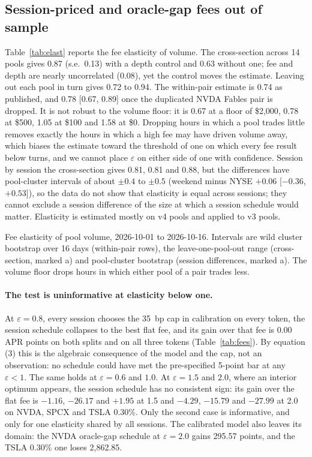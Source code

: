 \documentclass[11pt]{article}
\newcommand{\USD}{\$}
\newcommand{\tabfit}[1]{\begin{adjustbox}{max width=\linewidth,center}\small\end{adjustbox}}
\begin{document}
\subsection{Session-priced and oracle-gap fees out of sample}\label{sec:res:fees}

Table~\ref{tab:elast} reports the fee elasticity of volume. The cross-section across 14 pools gives 0.87 (s.e.\ 0.13) with a depth control and 0.63 without one; fee and depth are nearly uncorrelated (0.08), yet the control moves the estimate. Leaving out each pool in turn gives 0.72 to 0.94. The within-pair estimate is 0.74 as published, and 0.78 [0.67, 0.89] once the duplicated NVDA Fables pair is dropped. It is not robust to the volume floor: it is 0.67 at a floor of \USD2,000, 0.78 at \USD500, 1.05 at \USD100 and 1.58 at \USD0. Dropping hours in which a pool trades little removes exactly the hours in which a high fee may have driven volume away, which biases the estimate toward the threshold of one on which every fee result below turns, and we cannot place $\varepsilon$ on either side of one with confidence. Session by session the cross-section gives 0.81, 0.81 and 0.88, but the differences have pool-cluster intervals of about $\pm0.4$ to $\pm0.5$ (weekend minus NYSE $+0.06$ [$-0.36$, $+0.53$]), so the data do not show that elasticity is equal across sessions; they cannot exclude a session difference of the size at which a session schedule would matter. Elasticity is estimated mostly on v4 pools and applied to v3 pools.

\begin{table}[!tbp]
\centering
\caption{Fee elasticity of pool volume, 2026-10-01 to 2026-10-16. Intervals are wild cluster bootstrap over 16 days (within-pair rows), the leave-one-pool-out range (cross-section, marked a) and pool-cluster bootstrap (session differences, marked a). The volume floor drops hours in which either pool of a pair trades less.}
\label{tab:elast}
\tabfit{t_elast.tex}
\end{table}

\paragraph{The test is uninformative at elasticity below one.} At $\varepsilon = 0.8$, every session chooses the 35~bp cap in calibration on every token, the session schedule collapses to the best flat fee, and its gain over that fee is 0.00 APR points on both splits and on all three tokens (Table~\ref{tab:fees}). By equation (3) this is the algebraic consequence of the model and the cap, not an observation: no schedule could have met the pre-specified 5-point bar at any $\varepsilon<1$. The same holds at $\varepsilon=0.6$ and $1.0$. At $\varepsilon = 1.5$ and $2.0$, where an interior optimum appears, the session schedule has no consistent sign: its gain over the flat fee is $-1.16$, $-26.17$ and $+1.95$ at 1.5 and $-4.29$, $-15.79$ and $-27.99$ at 2.0 on NVDA, SPCX and TSLA 0.30\%. Only the second case is informative, and only for one elasticity shared by all sessions. The calibrated model also leaves its domain: the NVDA oracle-gap schedule at $\varepsilon=2.0$ gains 295.57 points, and the TSLA 0.30\% one loses 2,862.85.
\end{document}
